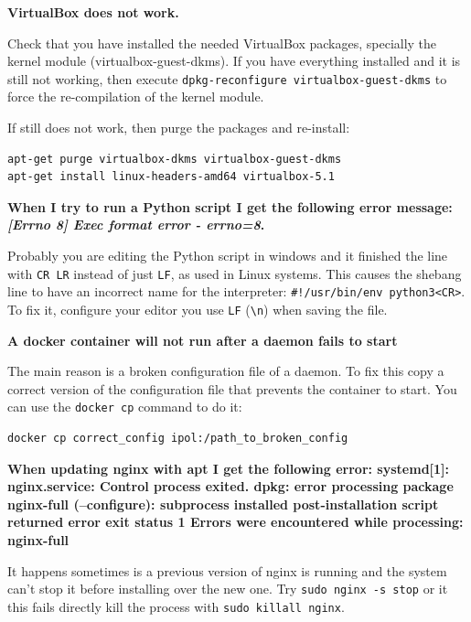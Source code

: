 \documentclass[a4paper,12pt]{article}
\begin{document}
\textbf{VirtualBox does not work.}

Check that you have installed the needed VirtualBox packages, specially the kernel module (virtualbox-guest-dkms).
If you have everything installed and it is still not working, then execute {\tt dpkg-reconfigure virtualbox-guest-dkms} to force the re-compilation of the kernel module.

If still does not work, then purge the packages and re-install:

\begin{verbatim}
apt-get purge virtualbox-dkms virtualbox-guest-dkms
apt-get install linux-headers-amd64 virtualbox-5.1
\end{verbatim}
\vspace{0.5cm}

\textbf{When I try to run a Python script I get the following error message: \emph{[Errno 8] Exec format error - errno=8}.}

Probably you are editing the Python script in windows and it finished the line with {\tt CR LR} instead of just {\tt LF}, as used in Linux systems. This causes the shebang line to have an incorrect name for the interpreter: {\tt \#!/usr/bin/env python3<CR>}. To fix it, configure your editor you use {\tt LF} ({\tt \textbackslash n}) when saving the file.
\vspace{0.5cm}

\textbf{A docker container will not run after a daemon fails to start}

The main reason is a broken configuration file of a daemon. To fix this copy a correct version of the configuration file that prevents the container to start. You can use the {\tt docker cp} command to do it:

\begin{verbatim}
docker cp correct_config ipol:/path_to_broken_config
\end{verbatim}

\textbf{When updating nginx with apt I get the following error: systemd[1]: nginx.service: Control process exited. dpkg: error processing package nginx-full (--configure):  subprocess installed post-installation script returned error exit status 1 Errors were encountered while processing:  nginx-full}

It happens sometimes is a previous version of nginx is running and the system can't stop it before installing over the new one. Try {\tt sudo nginx -s stop} or it this fails directly kill the process with {\tt sudo killall nginx}.
\vspace{0.5cm}
\end{document}
